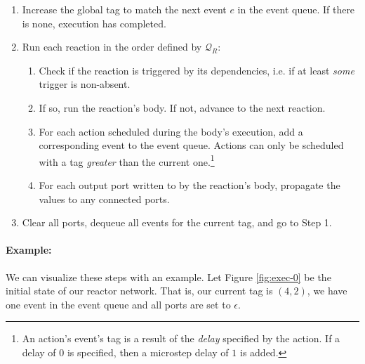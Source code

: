 \begin{enumerate}
    \item Increase the global tag to match the next event $e$ in the event queue.
    If there is none, execution has completed.

    \item Run each reaction in the order defined by $\mathcal{Q}_R$:
    \begin{enumerate}
        \item Check if the reaction is triggered by its dependencies, i.e. if at least \emph{some} trigger is non-absent.
        \item If so, run the reaction's body. 
        If not, advance to the next reaction.
        \item For each action scheduled during the body's execution, add a corresponding event to the event queue.
        Actions can only be scheduled with a tag \emph{greater} than the current one.\footnote{
            An action's event's tag is a result of the \emph{delay} specified by the action. 
            If a delay of $0$ is specified, then a microstep delay of $1$ is added.
        }
        \item For each output port written to by the reaction's body, propagate the values to any connected ports.
    \end{enumerate}

    \item Clear all ports, dequeue all events for the current tag, and go to Step 1.
\end{enumerate}

\paragraph{Example:}

We can visualize these steps with an example. 
Let Figure \ref{fig:exec-0} be the initial state of our reactor network.
That is, our current tag is $(4,2)$, we have one event in the event queue and all ports are set to $\epsilon$.


